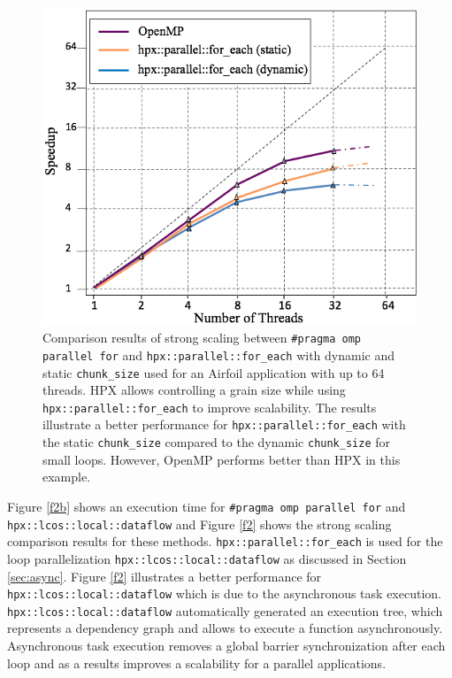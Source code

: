 \documentclass[conference]{IEEEtran}
\begin{document}
\begin{figure} 
\begin{center}
\centering
\includegraphics[width=1\columnwidth]{Pictures/parallel_for_each.jpg}
\caption {\small{Comparison results of strong scaling between \texttt{\#pragma omp parallel for} and \texttt{hpx::parallel::for\_each} with dynamic and static \texttt{chunk\_size} used for an Airfoil application
with up to 64 threads. HPX allows controlling a grain size while using \texttt{hpx::parallel::for\_each} to improve scalability. The results illustrate a better performance for \texttt{hpx::parallel::for\_each} with the static \texttt{chunk\_size} compared to the dynamic \texttt{chunk\_size} for small loops. However, OpenMP performs better than HPX in this example.}}
\label{f1}
\end{center}
\end{figure}




Figure \ref{f2b} shows an execution time for \texttt{\#pragma omp parallel for} and \texttt{hpx::lcos::local::dataflow} and Figure \ref{f2} shows the strong scaling comparison results for these methods. \texttt{hpx::parallel::for\_each} is used for the loop parallelization \texttt{hpx::lcos::local::dataflow} as discussed in Section \ref{sec:async}. Figure \ref{f2} illustrates a better performance for \texttt{hpx::lcos::local::dataflow} which is due to the asynchronous task execution. \texttt{hpx::lcos::local::dataflow} automatically generated an execution tree, which represents a dependency graph and allows to execute a function asynchronously. Asynchronous task execution removes a global barrier synchronization after each loop and as a results improves a scalability for a parallel applications.    
\end{document}
